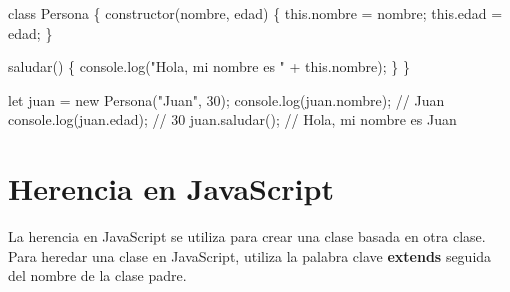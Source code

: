 \documentclass[
  a4paper,
  DIV=11,
  numbers=noendperiod,
  onepage,
  openany]{scrreprt}
\newenvironment{Shaded}{\begin{snugshade}}{\end{snugshade}}
\newcommand{\AttributeTok}[1]{\textcolor[rgb]{0.40,0.45,0.13}{#1}}
\newcommand{\BuiltInTok}[1]{\textcolor[rgb]{0.00,0.23,0.31}{#1}}
\newcommand{\CommentTok}[1]{\textcolor[rgb]{0.37,0.37,0.37}{#1}}
\newcommand{\DecValTok}[1]{\textcolor[rgb]{0.68,0.00,0.00}{#1}}
\newcommand{\FunctionTok}[1]{\textcolor[rgb]{0.28,0.35,0.67}{#1}}
\newcommand{\KeywordTok}[1]{\textcolor[rgb]{0.00,0.23,0.31}{#1}}
\newcommand{\NormalTok}[1]{\textcolor[rgb]{0.00,0.23,0.31}{#1}}
\newcommand{\OperatorTok}[1]{\textcolor[rgb]{0.37,0.37,0.37}{#1}}
\newcommand{\StringTok}[1]{\textcolor[rgb]{0.13,0.47,0.30}{#1}}
\begin{document}
\begin{Shaded}
\begin{Highlighting}[]
\KeywordTok{class}\NormalTok{ Persona \{}
    \FunctionTok{constructor}\NormalTok{(nombre}\OperatorTok{,}\NormalTok{ edad) \{}
        \KeywordTok{this}\OperatorTok{.}\AttributeTok{nombre} \OperatorTok{=}\NormalTok{ nombre}\OperatorTok{;}
        \KeywordTok{this}\OperatorTok{.}\AttributeTok{edad} \OperatorTok{=}\NormalTok{ edad}\OperatorTok{;}
\NormalTok{    \}}

    \FunctionTok{saludar}\NormalTok{() \{}
        \BuiltInTok{console}\OperatorTok{.}\FunctionTok{log}\NormalTok{(}\StringTok{"Hola, mi nombre es "} \OperatorTok{+} \KeywordTok{this}\OperatorTok{.}\AttributeTok{nombre}\NormalTok{)}\OperatorTok{;}
\NormalTok{    \}}
\NormalTok{\}}

\KeywordTok{let}\NormalTok{ juan }\OperatorTok{=} \KeywordTok{new} \FunctionTok{Persona}\NormalTok{(}\StringTok{"Juan"}\OperatorTok{,} \DecValTok{30}\NormalTok{)}\OperatorTok{;}
\BuiltInTok{console}\OperatorTok{.}\FunctionTok{log}\NormalTok{(juan}\OperatorTok{.}\AttributeTok{nombre}\NormalTok{)}\OperatorTok{;} \CommentTok{// Juan}
\BuiltInTok{console}\OperatorTok{.}\FunctionTok{log}\NormalTok{(juan}\OperatorTok{.}\AttributeTok{edad}\NormalTok{)}\OperatorTok{;} \CommentTok{// 30}
\NormalTok{juan}\OperatorTok{.}\FunctionTok{saludar}\NormalTok{()}\OperatorTok{;} \CommentTok{// Hola, mi nombre es Juan}
\end{Highlighting}
\end{Shaded}

\section{Herencia en JavaScript}\label{herencia-en-javascript}

La herencia en JavaScript se utiliza para crear una clase basada en otra
clase. Para heredar una clase en JavaScript, utiliza la palabra clave
\textbf{extends} seguida del nombre de la clase padre.
\end{document}
